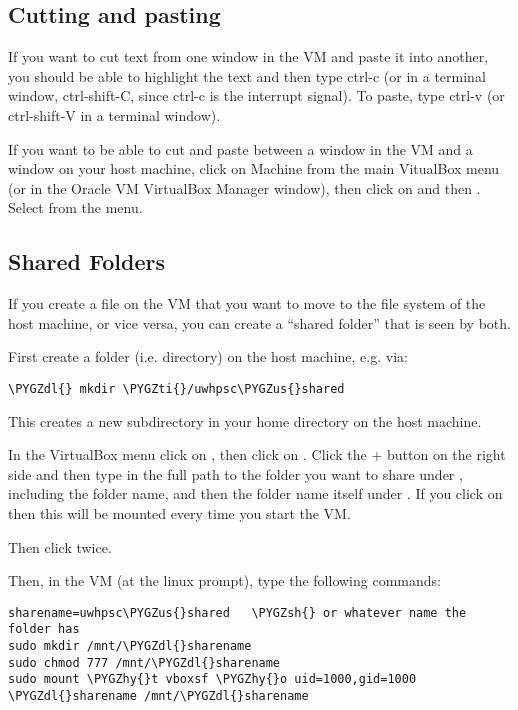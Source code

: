 \documentclass[letterpaper,10pt,english]{sphinxmanual}
\def\PYGZus{\char`\_}
\def\PYGZsh{\char`\#}
\def\PYGZdl{\char`\$}
\def\PYGZhy{\char`\-}
\def\PYGZti{\char`\~}
\begin{document}
\subsection{Cutting and pasting}
\label{vm:cutting-and-pasting}
If you want to cut text from one window in the VM and paste it into another,
you should be able to highlight the text and then type ctrl-c (or in a
terminal window, ctrl-shift-C, since ctrl-c is the interrupt signal). To
paste, type ctrl-v (or ctrl-shift-V in a terminal window).

If you want to be able to cut and paste between a window in the VM and a
window on your host machine, click on Machine from the main VitualBox menu
(or  in the Oracle VM VirtualBox Manager window), then click on
 and then .  Select  from the  menu.


\subsection{Shared Folders}
\label{vm:shared-folders}
If you create a file on the VM that you want to move to the file system of
the host machine, or vice versa, you can create a ``shared folder'' that is
seen by both.

First create a folder (i.e. directory) on the host machine, e.g. via:

\begin{Verbatim}[commandchars=\\\{\}]
\PYGZdl{} mkdir \PYGZti{}/uwhpsc\PYGZus{}shared
\end{Verbatim}

This creates a new subdirectory in your home directory on the host machine.

In the VirtualBox menu click on , then click on
.  Click the + button on the right side and then type in the
full path to the folder you want to share under , including the
folder name, and then the folder name itself under .
If you click on  then this will be mounted every time you start
the VM.

Then click  twice.

Then, in the VM (at the linux prompt), type the following commands:

\begin{Verbatim}[commandchars=\\\{\}]
sharename=uwhpsc\PYGZus{}shared   \PYGZsh{} or whatever name the folder has
sudo mkdir /mnt/\PYGZdl{}sharename
sudo chmod 777 /mnt/\PYGZdl{}sharename
sudo mount \PYGZhy{}t vboxsf \PYGZhy{}o uid=1000,gid=1000 \PYGZdl{}sharename /mnt/\PYGZdl{}sharename
\end{Verbatim}
\end{document}
